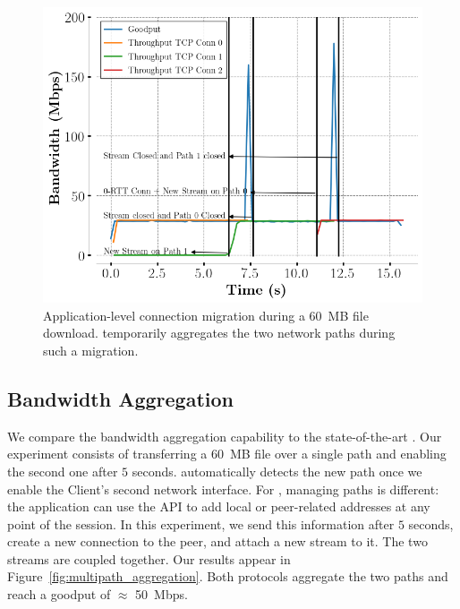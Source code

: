 \begin{figure}[!t]
  \begin{center}
    \includegraphics[width=.8\columnwidth]{figures/migration.png}
  \end{center}
  \caption{Application-level connection migration during a 60~MB file download.
    \tcpls temporarily aggregates the two network paths during such a migration.}
  \label{fig:conn_migration}
\end{figure}

\subsection{Bandwidth Aggregation}
\label{sec:bwaggr}
We compare the \tcpls bandwidth aggregation capability to the state-of-the-art
\mptcp. 
Our experiment consists of transferring a 60~MB file over a single path
and enabling the second one after $5$ seconds. \mptcp automatically detects
the new path once we enable the Client's second network interface. For \tcpls,
managing paths is different: the application can use the API to add local or
peer-related addresses at any point of the session. In this experiment, we send
this information after $5$ seconds, create a new \tcp connection to the peer, 
and
attach a new stream to it. The two streams are coupled together. Our results 
appear in Figure~\ref{fig:multipath_aggregation}. Both protocols aggregate the 
two paths and reach a goodput of $\approx$ 50~Mbps.

